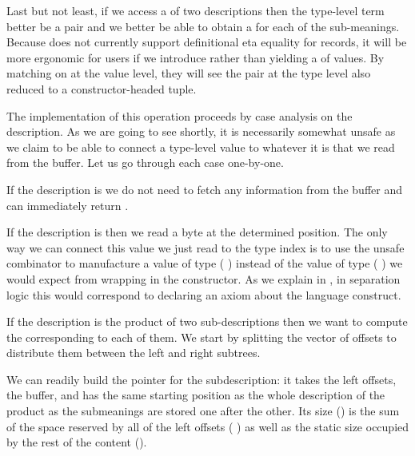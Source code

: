 Last but not least, if we access a  of two descriptions
then the type-level term better be a pair
and we better be able to obtain a 
for each of the sub-meanings.
%
Because \idris{} does not currently support definitional eta equality
for records, it will be more ergonomic for users if we introduce
 rather than yielding a  of values.
By matching on  at the value level, they will see the
pair at the type level also reduced to a constructor-headed tuple.


The implementation of this operation proceeds by case analysis
on the description.
%
As we are going to see shortly, it is necessarily somewhat unsafe
as we claim to be able to connect a type-level value to whatever
it is that we read from the buffer.
%
Let us go through each case one-by-one.


If the description is  we do not need to fetch any
information from the buffer and can immediately return \IdrisData{()}.


If the description is  then we read a byte at the
determined position. The only way we can connect this value we just
read to the type index is to use the unsafe combinator
 to manufacture a value of type
( ) instead of the value of type
( )
we would expect from wrapping  in the  constructor.
%
As we explain in ,
in separation logic this would correspond to declaring an axiom
about the  language construct.


If the description is the product of two sub-descriptions then we
want to compute the  corresponding to
each of them.
%
We start by splitting the vector of offsets to distribute them between
the left and right subtrees.

We can readily build the pointer for the  subdescription:
it takes the left offsets, the buffer, and has the same starting position
as the whole description of the product as the submeanings are stored one after the other.
Its size () is the sum of the space reserved by all of the left offsets
( ) as well as the static size occupied
by the rest of the content  ().

